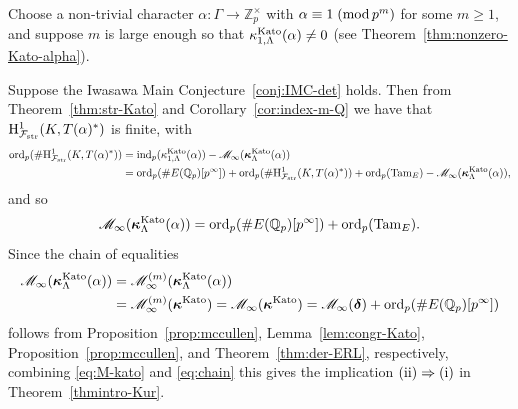 \documentclass[10pt,reqno]{amsart}
\numberwithin{equation}{section}
\theoremstyle{plain}
\theoremstyle{definition}
\theoremstyle{definition}
\theoremstyle{plain}
\theoremstyle{plain}
\theoremstyle{plain}
\theoremstyle{plain}
\theoremstyle{plain}
\theoremstyle{plain}
\newcommand{\Z}{\mathbb{Z}}
\newcommand{\Q}{\mathbb{Q}}
\newcommand{\Fcal}{\mathcal{F}}
\newcommand{\rH}{\mathrm{H}}
\begin{document}
Choose a non-trivial character $\alpha:\Gamma\rightarrow\Z_p^\times$ with $\alpha\equiv 1\;({\rm mod}\,p^m)$ for some $m\geq 1$, and suppose $m$ is large enough so that $\kappa_{1,\Lambda}^{\rm Kato}(\alpha)\neq 0$ (see Theorem~\ref{thm:nonzero-Kato-alpha}).

Suppose the Iwasawa Main Conjecture~\ref{conj:IMC-det} holds. Then from Theorem~\ref{thm:str-Kato} and Corollary~\ref{cor:index-m-Q} we have that $\rH^1_{\Fcal_{\rm str}}(K,T(\alpha)^*)$ is finite, with
\begin{align*}
{\rm ord}_p(\#\rH^1_{\Fcal_{\rm str}}(K,T(\alpha)^*))&=
{\rm ind}_p(\kappa_{1,\Lambda}^{\rm Kato}(\alpha))-\mathscr{M}_\infty(\boldsymbol{\kappa}_\Lambda^{\rm Kato}(\alpha))\\
&={\rm ord}_p(\#E(\Q_p)[p^\infty])+{\rm ord}_{p}(\#\rH^1_{\Fcal_{\rm str}}(K,T(\alpha)^*))+{\rm ord}_p({\rm Tam}_E)-\mathscr{M}_\infty(\boldsymbol{\kappa}_\Lambda^{\rm Kato}(\alpha)),
\end{align*}
and so
\begin{equation}\label{eq:M-kato}
\mathscr{M}_\infty(\boldsymbol{\kappa}_{\Lambda}^{\rm Kato}(\alpha))={\rm ord}_p(\#E(\Q_p)[p^\infty])+{\rm ord}_p({\rm Tam}_E).
\end{equation}
Since the chain of equalities
\begin{equation}\label{eq:chain}
\begin{aligned}
\mathscr{M}_\infty(\boldsymbol{\kappa}_\Lambda^{\rm Kato}(\alpha))&=\mathscr{M}_\infty^{(m)}(\boldsymbol{\kappa}_\Lambda^{\rm Kato}(\alpha))\\
&=
\mathscr{M}_\infty^{(m)}(\boldsymbol{\kappa}^{\rm Kato})=\mathscr{M}_\infty(\boldsymbol{\kappa}^{\rm Kato})=\mathscr{M}_\infty(\boldsymbol{\delta})+{\rm ord}_p(\#E(\Q_p)[p^\infty])
\end{aligned}
\end{equation}
follows from Proposition~\ref{prop:mccullen}, Lemma~\ref{lem:congr-Kato}, Proposition~\ref{prop:mccullen}, and Theorem~\ref{thm:der-ERL}, respectively, combining \eqref{eq:M-kato} and \eqref{eq:chain} this gives the implication ${\rm (ii)}\Rightarrow{\rm (i)}$ in Theorem~\ref{thmintro-Kur}. 
\end{document}

